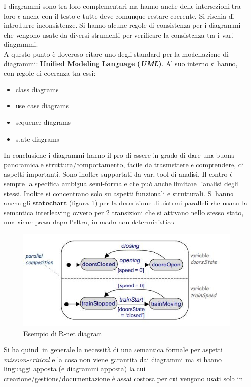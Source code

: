 \documentclass[a4paper,12pt, oneside]{book}
\begin{document}
I diagrammi sono tra loro complementari ma hanno anche delle intersezioni tra
loro e anche con il testo e tutto deve comunque restare coerente. Si rischia di
introdurre inconsistenze. Si hanno alcune regole di consistenza per i diagrammi
che vengono usate da diversi strumenti per verificare la consistenza tra i vari
diagrammi. \\
A questo punto è doveroso citare uno degli standard per la modellazione di
diagrammi: \textbf{Unified Modeling Language (\textit{UML})}. Al suo interno si
hanno, con regole di coerenza tra essi:
\begin{itemize}
  \item class diagrams
  \item use case diagrams
  \item sequence diagrams
  \item state diagrams
\end{itemize}
In conclusione i diagrammi hanno il pro di essere in grado di dare una buona
panoramica e struttura/comportamento, facile da trasmettere e comprendere, di
aspetti importanti. Sono inoltre supportati da vari tool di analisi. Il contro è
sempre la specifica ambigua semi-formale che può anche limitare l'analisi degli
stessi. Inoltre si concentrano solo su aspetti funzionali e strutturali.
Si hanno anche gli \textbf{statechart} (figura \ref{fig:sta}) per la descrizione
di sistemi paralleli 
che usano la semantica interleaving ovvero per 2 transizioni che si attivano
nello stesso stato, una viene presa dopo l'altra, in modo non deterministico.
\begin{figure}
  \centering
  \includegraphics[scale = 0.5]{img/sta.jpg}
  \caption{Esempio di R-net diagram}
  \label{fig:sta}
\end{figure}
Si ha
quindi in generale la necessità di una semantica formale per aspetti
\textit{mission-critical} e la cosa non viene garantita dai diagrammi ma si
hanno linguaggi apposta (e diagrammi apposta) la cui
creazione/gestione/documentazione è assai costosa per cui vengono usati solo in
\end{document}

